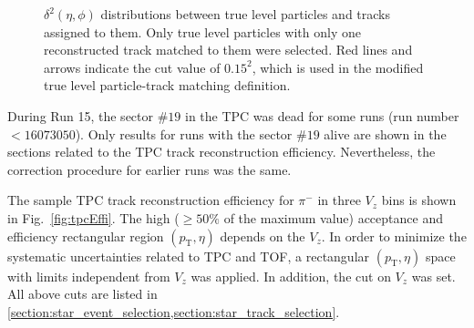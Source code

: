 \begin{figure}[h!]
\begin{subfigure}{.49\textwidth}
	\end{subfigure}
	\begin{minipage}{.49\textwidth}
		\caption[$\delta^2\left(\eta,\phi\right)$ distributions between true level particles and tracks assigned to them. Only true level particles with only one reconstructed track matched to them were selected]{$\delta^2\left(\eta,\phi\right)$ distributions between true level particles and tracks assigned to them. Only true level particles with only one reconstructed track matched to them were selected. Red lines and arrows indicate the cut value of $0.15^2$, which is used in the modified true level particle-track matching definition.}
		\label{fig:matchingMC}
	\end{minipage}
	
\end{figure}
During Run 15, the sector $\#19$ in the TPC was dead for some runs (run number $<16073050$).  Only results for runs with the sector $\#19$ alive  are shown in the sections related to the TPC track reconstruction efficiency. Nevertheless, the correction procedure for earlier runs was the same.

The sample TPC track reconstruction efficiency for $\pi^-$ in three $V_z$ bins is shown in Fig.~\ref{fig:tpcEffi}. The high  ($\geq 50\%$ of the maximum value) acceptance and efficiency rectangular region $(p_\textrm{T},\eta)$ depends on the $V_z$. In order to minimize the systematic uncertainties related to TPC and TOF,  a rectangular $(p_\textrm{T}, \eta)$ space with limits independent from $V_z$ was applied. In addition, the cut on $V_z$ was set. All above cuts are listed in \cref{section:star_event_selection,section:star_track_selection}.

